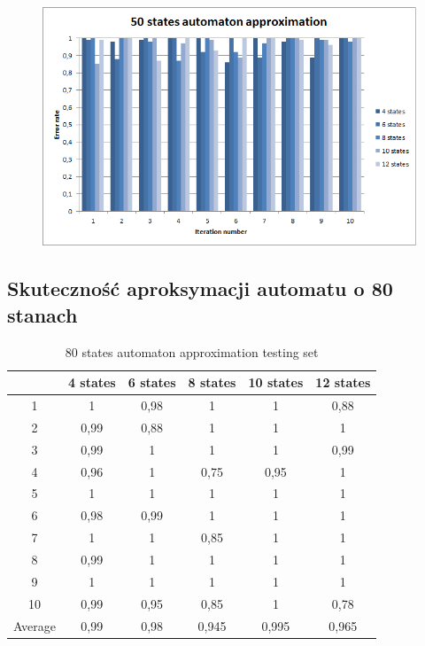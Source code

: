 \documentclass[runningheads,a4paper]{llncs}
\begin{document}
\begin{figure}
\centering
\includegraphics[scale=1]{9.png}
\end{figure}

\FloatBarrier
\subsection{Skuteczność aproksymacji automatu o 80 stanach}


\begin{table}[]
\centering
\caption{80 states automaton approximation testing set}
\label{my-label}
\begin{tabular}{@{}cccccc@{}}
\toprule
        & 4 states & 6 states & 8 states & 10 states & 12 states    \\ \midrule
1       & 1        & 0,98     & 1        & 1         & 0,88 \\
2       & 0,99     & 0,88     & 1        & 1         & 1 \\
3       & 0,99     & 1        & 1        & 1         & 0,99 \\
4       & 0,96     & 1        & 0,75     & 0,95      & 1   \\
5       & 1        & 1        & 1        & 1         & 1   \\
6       & 0,98     & 0,99     & 1        & 1         & 1    \\
7       & 1        & 1        & 0,85     & 1         & 1    \\
8       & 0,99     & 1        & 1        & 1         & 1     \\
9       & 1        & 1        & 1        & 1         & 1 \\
10      & 0,99     & 0,95     & 0,85     & 1         & 0,78  \\
Average & 0,99     & 0,98     & 0,945    & 0,995     & 0,965  \\ \bottomrule
\end{tabular}
\end{table}
\end{document}
